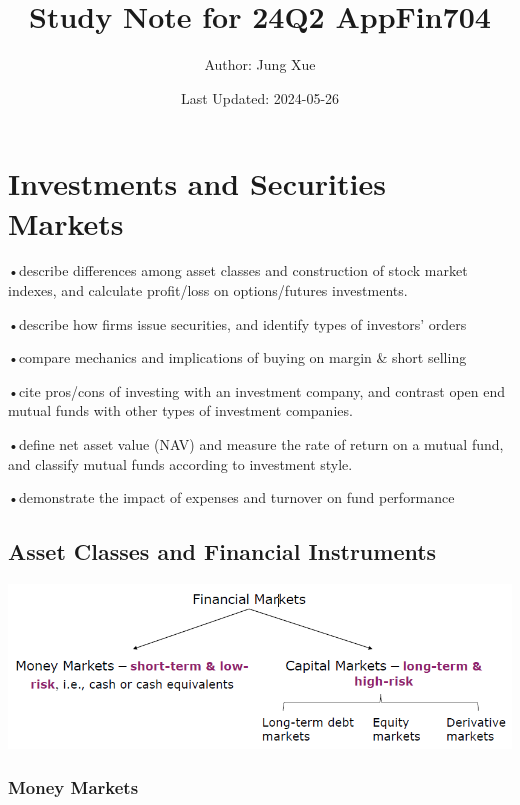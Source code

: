 \documentclass[
]{book}
\title{Study Note for 24Q2 AppFin704}
\author{Author: Jung Xue}
\date{Last Updated: 2024-05-26}
\begin{document}
\maketitle

{
\setcounter{tocdepth}{1}
\tableofcontents
}
\chapter{Investments and Securities Markets}\label{ch1}

•describe differences among asset classes and construction of stock market indexes, and calculate profit/loss on options/futures investments.

•describe how firms issue securities, and identify types of investors' orders

•compare mechanics and implications of buying on margin \& short selling

•cite pros/cons of investing with an investment company, and contrast open end mutual funds with other types of investment companies.

•define net asset value (NAV) and measure the rate of return on a mutual fund, and classify mutual funds according to investment style.

•demonstrate the impact of expenses and turnover on fund performance

\section{Asset Classes and Financial Instruments}\label{asset-classes-and-financial-instruments}

\includegraphics{Resources/Financialmarkets.png}

\subsection{Money Markets}\label{money-markets}
\end{document}
